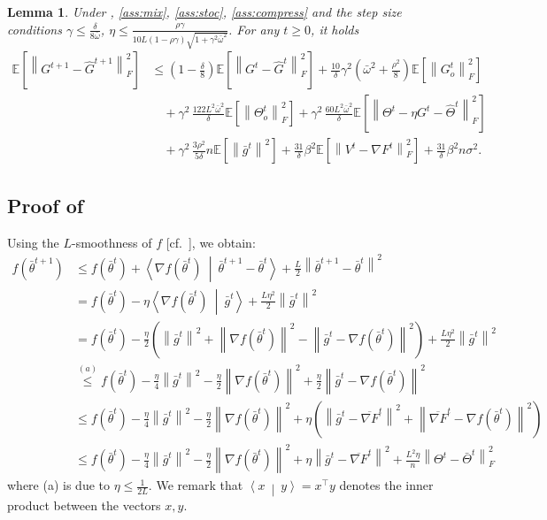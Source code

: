 \documentclass[10pt]{article} %
\theoremstyle{plain}
\newtheorem{lemma}[theorem]{Lemma}
\theoremstyle{definition}
\theoremstyle{remark}
\newcommand{\prm}{\theta}
\newcommand{\Prm}{\Theta}
\newcommand{\grdF}{\nabla F}
\newcommand{\bw}{\bar{\omega}}
\newcommand{\avgg}{\bar{g}}
\newcommand{\avgtheta}{\bar{\prm}}
\newcommand{\avgTheta}{\bar{\Prm}}
\newcommand{\dotp}[2]{\left\langle{#1}\ \middle|\ {#2}\right\rangle}
\newcommand{\norm}[1]{\left\| #1 \right\|}
\newcommand{\nl}{\nonumber\\}
\newcommand{\avggrdF}{\overline{\nabla F}}
\newcommand{\hatTheta}{\widehat{\Theta}}
\newcommand{\hatG}{\widehat{G}}
\begin{document}
\begin{lemma} \label{lem:gtghat_new} Under , \ref{ass:mix}, \ref{ass:stoc}, \ref{ass:compress} and the step size conditions $\gamma \leq \frac{\delta}{8 \bw}$, $\eta \leq \frac{ \rho \gamma }{ 10 L (1-\rho\gamma) \sqrt{1 + \gamma^2 \bw^2} }$. For any $t \geq 0$, it holds
    \begin{align*}
    \mathbb{E} \left[ \norm{ G^{t+1} - \hatG^{t+1} }_F^2 \right] & \leq \left(1 - \frac{\delta}{8} \right) \mathbb{E} \left[ \norm{ G^{t} - \hatG^{t} }_F^2 \right] + \frac{10}{\delta} \gamma^2 \left( \bw^2 + \frac{\rho^2 }{8} \right) \mathbb{E} \left[ \norm{G_o^t}_F^2 \right] \nl 
    & \quad + \gamma^2 \, \frac{122L^2\bw^2}{\delta} \mathbb{E} \left[ \norm{\Theta_o^t}_F^2 \right] + \gamma^2 \, \frac{60 L^2 \bw^2}{\delta} \mathbb{E} \left[ \norm{ \Theta^t - \eta G^t - \hatTheta^t }_F^2 \right] \nl
    & \quad + \gamma^2 \, \frac{3 \rho^2}{5 \delta} n \mathbb{E} \left[ \norm{ \avgg^t }^2 \right]  + \frac{31}{\delta} \beta^2 \mathbb{E} \left[ \norm{ V^t - \grdF^t }_F^2 \right] + \frac{31}{\delta} \beta^2 n \sigma^2 .
    \end{align*}
\end{lemma}
\fi 


\subsection{Proof of } \label{app:f1step}
Using the $L$-smoothness of $f$ [cf.~], we obtain:
\begin{align}
    f(\bar{\theta}^{t+1}) &\le f(\bar{\theta}^t) + \dotp{\nabla f(\bar{\theta}^t)}{\bar{\theta}^{t+1} - \bar{\theta}^t} + \frac{L}{2} \norm{\avgtheta^{t+1} - \avgtheta^t}^2
    \nl & = f(\avgtheta^t) - \eta \dotp{\nabla f(\avgtheta^t)}{\avgg^t} + \frac{L \eta^2}{2} \norm{\avgg^t}^2
    \nl &= f(\avgtheta^t) - \frac{\eta}{2}\left(\norm{\avgg^t}^2 + \norm{\nabla f(\avgtheta^t)}^2 - \norm{\avgg^t - \nabla f(\avgtheta^t)}^2\right) + \frac{L\eta^2}{2} \norm{\avgg^t}^2
    \nl &\stackrel{(a)}{\leq} f(\avgtheta^t) - \frac{\eta}{4}\norm{\avgg^t}^2 - \frac{\eta}{2}\norm{\nabla f(\avgtheta^t)}^2 + \frac{\eta}{2}\norm{\avgg^t - \nabla f(\avgtheta^t)}^2
    \nl &\leq f(\avgtheta^t) - \frac{\eta}{4}\norm{\avgg^t}^2 - \frac{\eta}{2}\norm{\nabla f(\avgtheta^t)}^2 + \eta\left(\norm{\avgg^t - \avggrdF^t}^2 + \norm{\avggrdF^t - \nabla f(\avgtheta^t)}^2 \right)
    \nl &\leq f(\avgtheta^t) - \frac{\eta}{4}\norm{\avgg^t}^2 - \frac{\eta}{2}\norm{\nabla f(\avgtheta^t)}^2 + \eta\norm{\avgg^t - \avggrdF^t}^2 + \frac{L^2\eta}{n}\norm{\Theta^t - \avgTheta^t}_F^2
\end{align}
where (a) is due to $\eta\leq \frac{1}{2L}$. We remark that $\dotp{x}{y} = x^\top y$ denotes the inner product between the vectors $x,y$.
\end{document}
